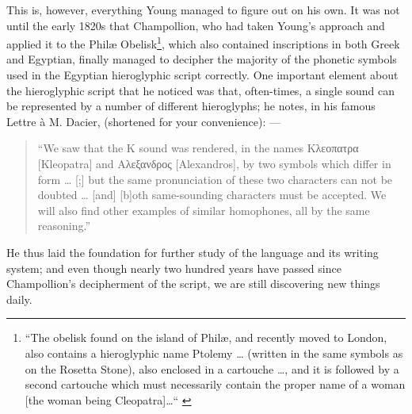 	This is, however, everything Young managed to figure out on his own. It was not until the early 1820s that Champollion, who had taken Young’s approach and applied it to the Philæ Obelisk\footnote{“The obelisk found on the island of Philæ, and recently moved to London, also contains a hieroglyphic name Ptolemy … (written in the same symbols as on the Rosetta Stone), also enclosed in a cartouche …, and it is followed by a second cartouche which must necessarily contain the proper name of a woman [the woman being Cleopatra]…“ \parencite[p. 3]{lettre}}, which also contained inscriptions in both Greek and Egyptian, finally managed to decipher the majority of the phonetic symbols used in the Egyptian hieroglyphic script correctly. One important element about the hieroglyphic script that he noticed was that, often-times, a single sound can be represented by a number of different hieroglyphs; he notes, in his famous Lettre à M. Dacier, (shortened for your convenience): —

	\begin{quote}
		“We saw that the K sound was rendered, in the names \textgreek{Κλεοπατρα} [Kleopatra] and \textgreek{Aλεξανδρος} [Alexandros], by two symbols which differ in form … [;] but the same pronunciation of these two characters can not be doubted … [and] [b]oth same-sounding characters must be accepted. We will also find other examples of similar homophones, all by the same reasoning.” \parencite[p. 5]{lettre}
	\end{quote}

	He thus laid the foundation for further study of the language and its writing system; and even though nearly two hundred years have passed since Champollion’s decipherment of the script, we are still discovering new things daily.
